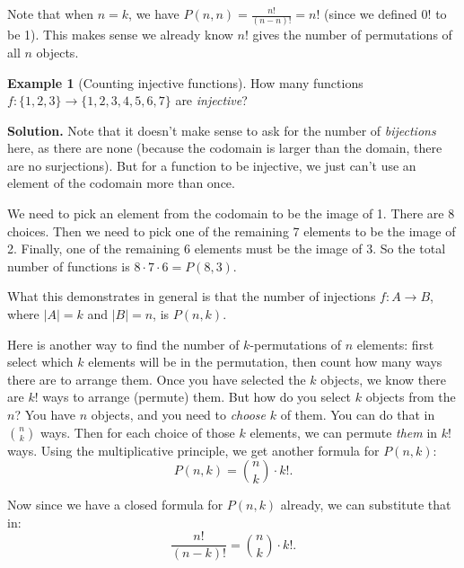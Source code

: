 \documentclass[10pt,]{book}
\theoremstyle{plain}
\theoremstyle{definition}
\newtheorem{example}[theorem]{Example}
\theoremstyle{definition}
\theoremstyle{definition}
\numberwithin{equation}{chapter}
\newcommand{\card}[1]{\left| #1 \right|}
\begin{document}
        Note that when \(n = k\), we have \(P(n,n) = \frac{n!}{(n-n)!} = n!\) (since we defined \(0!\) to be 1). This makes sense
        \textemdash{}we already know \(n!\) gives the number of permutations of all \(n\) objects.
\begin{example}[Counting injective functions]\label{ex_counting-functions-injective}
How many functions \(f:\{1,2,3\} \to \{1,2,3,4,5,6,7\}\) are \emph{injective}?%
\par\medskip\noindent%
\textbf{Solution.}\quad
            Note that it doesn't make sense to ask for the number of \emph{bijections} here, as there are none (because the codomain is larger than the domain, there are no surjections). But for a function to be injective, we just can't use an element of the codomain more than once.
\par

            We need to pick an element from the codomain to be the image of 1. There are 8 choices. Then we need to pick one of the remaining 7 elements to be the image of 2. Finally, one of the remaining 6 elements must be the image of 3. So the total number of functions is \(8\cdot 7 \cdot 6 = P(8,3)\).
\par

            What this demonstrates in general is that the number of injections \(f:A \to B\), where \(\card{A} = k\) and \(\card{B} = n\), is \(P(n,k)\).
\end{example}
\par

          Here is another way to find the number of \(k\)-permutations of \(n\) elements: first select which \(k\) elements will be in the permutation, then count how many ways there are to arrange them. Once you have selected the \(k\) objects, we know there are \(k!\) ways to arrange (permute) them. But how do you select \(k\) objects from the \(n\)? You have \(n\) objects, and you need to \emph{choose} \(k\) of them. You can do that in \({n \choose k}\) ways. Then for each choice of those \(k\) elements, we can permute \emph{them} in \(k!\) ways. Using the multiplicative principle, we get another formula for \(P(n,k)\):
          \begin{equation*}
            P(n,k) = {n \choose k}\cdot k!.
          \end{equation*}
\par

          Now since we have a closed formula for \(P(n,k)\) already, we can substitute that in:
          \begin{equation*}
            \frac{n!}{(n-k)!} = {n \choose k} \cdot k!.
          \end{equation*}
\par
\end{document}
